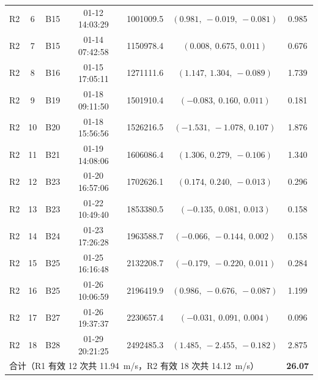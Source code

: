 \begin{table}[!htb]
\begin{tabular}{cclcrcc}
    R2 & 6 & B15 & 01-12 14:03:29 & 1001009.5 & $(0.981,\ -0.019,\ -0.081)$ & 0.985 \\
    R2 & 7 & B15 & 01-14 07:42:58 & 1150978.4 & $(0.008,\ 0.675,\ 0.011)$ & 0.676 \\
    R2 & 8 & B16 & 01-15 17:05:11 & 1271111.6 & $(1.147,\ 1.304,\ -0.089)$ & 1.739 \\
    R2 & 9 & B19 & 01-18 09:11:50 & 1501910.4 & $(-0.083,\ 0.160,\ 0.011)$ & 0.181 \\
    R2 & 10 & B20 & 01-18 15:56:56 & 1526216.5 & $(-1.531,\ -1.078,\ 0.107)$ & 1.876 \\
    R2 & 11 & B21 & 01-19 14:08:06 & 1606086.4 & $(1.306,\ 0.279,\ -0.106)$ & 1.340 \\
    R2 & 12 & B23 & 01-20 16:57:06 & 1702626.1 & $(0.174,\ 0.240,\ -0.013)$ & 0.296 \\
    R2 & 13 & B23 & 01-22 10:49:40 & 1853380.5 & $(-0.135,\ 0.081,\ 0.013)$ & 0.158 \\
    R2 & 14 & B24 & 01-23 17:26:28 & 1963588.7 & $(-0.066,\ -0.144,\ 0.002)$ & 0.158 \\
    R2 & 15 & B25 & 01-25 16:16:48 & 2132208.7 & $(-0.179,\ -0.220,\ 0.011)$ & 0.284 \\
    R2 & 16 & B25 & 01-26 10:06:59 & 2196419.9 & $(0.986,\ -0.676,\ -0.087)$ & 1.199 \\
    R2 & 17 & B27 & 01-26 19:37:37 & 2230657.4 & $(-0.031,\ 0.091,\ 0.004)$ & 0.096 \\
    R2 & 18 & B28 & 01-29 20:21:25 & 2492485.3 & $(1.485,\ -2.455,\ -0.182)$ & 2.875 \\
    \midrule
    \multicolumn{6}{l}{合计（R1 有效 12 次共 11.94~m/s，R2 有效 18 次共 14.12~m/s）} & \textbf{26.07} \\
    \bottomrule
  \end{tabular}
\end{table}
